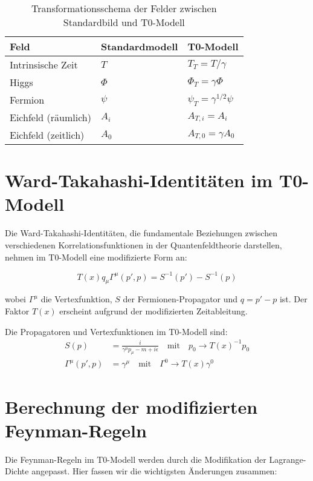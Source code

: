\documentclass{article}
\theoremstyle{definition}
\theoremstyle{remark}
\newcommand{\Tfield}{T(x)} %
\begin{document}
\begin{table}[h]
	\centering
	\begin{tabular}{|l|l|l|}
		\hline
		\textbf{Feld} & \textbf{Standardmodell} & \textbf{T0-Modell} \\
		\hline
		Intrinsische Zeit & $T$ & $T_T = T/\gamma$ \\
		Higgs & $\Phi$ & $\Phi_T = \gamma \Phi$ \\
		Fermion & $\psi$ & $\psi_T = \gamma^{1/2} \psi$ \\
		Eichfeld (räumlich) & $A_i$ & $A_{T,i} = A_i$ \\
		Eichfeld (zeitlich) & $A_0$ & $A_{T,0} = \gamma A_0$ \\
		\hline
	\end{tabular}
	\caption{Transformationsschema der Felder zwischen Standardbild und T0-Modell}
\end{table}

\section{Ward-Takahashi-Identitäten im T0-Modell}

Die Ward-Takahashi-Identitäten, die fundamentale Beziehungen zwischen verschiedenen Korrelationsfunktionen in der Quantenfeldtheorie darstellen, nehmen im T0-Modell eine modifizierte Form an:

\begin{equation}
	\Tfield q_\mu \Gamma^\mu(p',p) = S^{-1}(p') - S^{-1}(p)
\end{equation}

wobei $\Gamma^\mu$ die Vertexfunktion, $S$ der Fermionen-Propagator und $q = p' - p$ ist. Der Faktor $\Tfield$ erscheint aufgrund der modifizierten Zeitableitung.

Die Propagatoren und Vertexfunktionen im T0-Modell sind:
\begin{align}
	S(p) &= \frac{i}{\gamma^\mu p_\mu - m + i\epsilon} \quad \text{mit} \quad p_0 \rightarrow \Tfield^{-1}p_0 \\
	\Gamma^\mu(p',p) &= \gamma^\mu \quad \text{mit} \quad \Gamma^0 \rightarrow \Tfield \gamma^0
	\end{align}
	
	\section{Berechnung der modifizierten Feynman-Regeln}
	
	Die Feynman-Regeln im T0-Modell werden durch die Modifikation der Lagrange-Dichte angepasst. Hier fassen wir die wichtigsten Änderungen zusammen:
	
\end{document}

